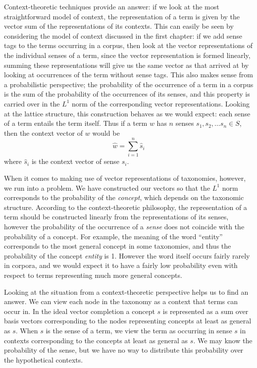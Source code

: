 Context-theoretic techniques provide an answer: if we look at the most straightforward model of context, the representation of a term is given by the vector sum of the representations of its contexts. This can easily be seen by considering the model of context discussed in the first chapter: if we add sense tags to the terms occurring in a corpus, then look at the vector representations of the individual senses of a term, since the vector representation is formed linearly, summing these representations will give us the same vector as that arrived at by looking at occurrences of the term without sense tags. This also makes sense from a probabilistic perspective; the probability of the occurrence of a term in a corpus is the sum of the probability of the occurrences of its senses, and this property is carried over in the $L^1$ norm of the corresponding vector representations. Looking at the lattice structure, this construction behaves as we would expect: each sense of a term entails the term itself. Thus if a term $w$ has $n$ senses $s_1, s_2, \ldots s_n \in S$, then the context vector of $w$ would be
$$\hat{w} = \sum_{i=1}^n \hat{s}_i$$
where $\hat{s}_i$ is the context vector of sense $s_i$.

When it comes to making use of vector representations of taxonomies, however, we run into a problem. We have constructed our vectors so that the $L^1$ norm corresponds to the probability of the \emph{concept}, which depends on the taxonomic structure. According to the context-theoretic philosophy, the representation of a term should be constructed linearly from the representations of its senses, however the probability of the occurrence of a \emph{sense} does not coincide with the probability of a concept. For example, the meaning of the word ``entity'' corresponds to the most general concept in some taxonomies, and thus the probability of the concept \emph{entity} is 1. However the word itself occurs fairly rarely in corpora, and we would expect it to have a fairly low probability even with respect to terms representing much more general concepts.

Looking at the situation from a context-theoretic perspective helps us to find an answer. We can view each node in the taxonomy as a context that terms can occur in. In the ideal vector completion a concept $s$ is represented as a sum over basis vectors corresponding to the nodes representing concepts at least as general as $s$. When $s$ is the sense of a term, we view the term as occurring in sense $s$ in contexts corresponding to the concepts at least as general as $s$. We may know the probability of the sense, but we have no way to distribute this probability over the hypothetical contexts.


